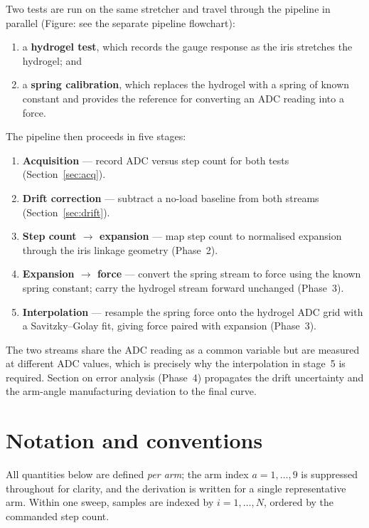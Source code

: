 \documentclass[11pt]{article}
\begin{document}
Two tests are run on the same stretcher and travel through the pipeline in parallel
(Figure: see the separate pipeline flowchart):
\begin{enumerate}[nosep,leftmargin=1.6em]
  \item a \textbf{hydrogel test}, which records the gauge response as the iris stretches the hydrogel; and
  \item a \textbf{spring calibration}, which replaces the hydrogel with a spring of known constant and provides the reference for converting an ADC reading into a force.
\end{enumerate}
The pipeline then proceeds in five stages:
\begin{enumerate}[nosep,leftmargin=1.6em]
  \item[\textbf{1.}] \textbf{Acquisition} --- record ADC versus step count for both tests (Section~\ref{sec:acq}).
  \item[\textbf{2.}] \textbf{Drift correction} --- subtract a no-load baseline from both streams (Section~\ref{sec:drift}).
  \item[\textbf{3.}] \textbf{Step count $\to$ expansion} --- map step count to normalised expansion through the iris linkage geometry (Phase~2).
  \item[\textbf{4.}] \textbf{Expansion $\to$ force} --- convert the spring stream to force using the known spring constant; carry the hydrogel stream forward unchanged (Phase~3).
  \item[\textbf{5.}] \textbf{Interpolation} --- resample the spring force onto the hydrogel ADC grid with a Savitzky--Golay fit, giving force paired with expansion (Phase~3).
\end{enumerate}
The two streams share the ADC reading as a common variable but are measured at different ADC
values, which is precisely why the interpolation in stage~5 is required. Section on error
analysis (Phase~4) propagates the drift uncertainty and the arm-angle manufacturing deviation
to the final curve.

\section{Notation and conventions}
\label{sec:notation}
All quantities below are defined \emph{per arm}; the arm index $a=1,\dots,9$ is suppressed
throughout for clarity, and the derivation is written for a single representative arm. Within
one sweep, samples are indexed by $i=1,\dots,N$, ordered by the commanded step count.
\end{document}
